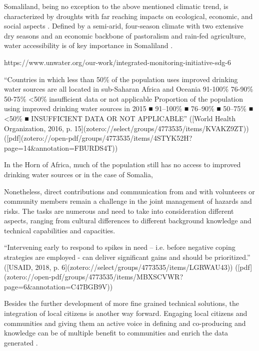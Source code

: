 Somaliland, being no exception to the above mentioned climatic trend, is characterized by droughts with far reaching impacts on ecological, economic, and social aspects \autocite{abdulkadirAssessmentDroughtRecurrence2017}. Defined by a semi-arid, four-season climate with two extensive dry seasons and an economic backbone of pastoralism and rain-fed agriculture, water accessibility is of key importance in Somaliland \autocite{abdulkadirAssessmentDroughtRecurrence2017,petrucciLandscapeLandformsNorthern2022,republicofsomalilandSomalilandCountryProfile2021}.


https://www.unwater.org/our-work/integrated-monitoring-initiative-sdg-6




“Countries in which less than 50\% of the population uses improved drinking water sources are all located in sub-Saharan Africa and Oceania 91-100\% 76-90\% 50-75\% <50\% insufficient data or not applicable Proportion of the population using improved drinking water sources in 2015 ■ 91–100\% ■ 76–90\% ■ 50–75\% ■ <50\% ■ INSUFFICIENT DATA OR NOT APPLICABLE” ([World Health Organization, 2016, p. 15](zotero://select/groups/4773535/items/KVAKZ9ZT)) ([pdf](zotero://open-pdf/groups/4773535/items/4STYK52H?page=14\&annotation=FBURDS4T))


In the Horn of Africa, much of the population still has no access to improved drinking water sources or in the case of Somalia,  


Nonetheless, direct contributions and communication from and with volunteers or community members remain a challenge in the joint management of hazards and risks. The tasks are numerous and need to take into consideration different aspects, ranging from cultural differences to different background knowledge and technical capabilities and capacities.

“Intervening early to respond to spikes in need – i.e. before negative coping strategies are employed - can deliver significant gains and should be prioritized.” ([USAID, 2018, p. 6](zotero://select/groups/4773535/items/LGRWAU43)) ([pdf](zotero://open-pdf/groups/4773535/items/MBXSCVWR?page=6&annotation=C47BGB9V))




Besides the further development of more fine grained technical solutions, the integration of local citizens is another way forward. Engaging local citizens and communities and giving them an active voice in defining and co-producing  and knowledge can be of multiple benefit to communities and enrich the data generated \autocite{somaliredcrescentsocietyFeasibilityStudyPotential2022, njambi-szlapkaIntegratingCommunityVoices}. 



